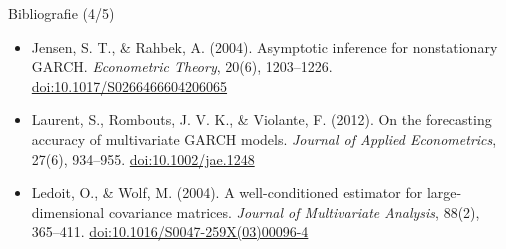 \begin{frame}{Bibliografie (4/5)}
\begin{itemize}
    \item Jensen, S. T., \& Rahbek, A. (2004). Asymptotic inference for nonstationary GARCH. \textit{Econometric Theory}, 20(6), 1203--1226. \href{https://doi.org/10.1017/S0266466604206065}{doi:10.1017/S0266466604206065}
    \item Laurent, S., Rombouts, J. V. K., \& Violante, F. (2012). On the forecasting accuracy of multivariate GARCH models. \textit{Journal of Applied Econometrics}, 27(6), 934--955. \href{https://doi.org/10.1002/jae.1248}{doi:10.1002/jae.1248}
    \item Ledoit, O., \& Wolf, M. (2004). A well-conditioned estimator for large-dimensional covariance matrices. \textit{Journal of Multivariate Analysis}, 88(2), 365--411. \href{https://doi.org/10.1016/S0047-259X(03)00096-4}{doi:10.1016/S0047-259X(03)00096-4}
\end{itemize}
\end{frame}

